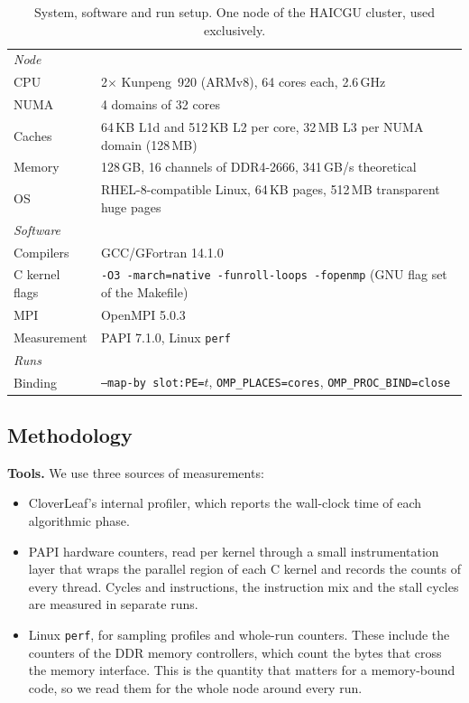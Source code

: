 \documentclass[a4paper,11pt]{article}
\newcommand{\GBs}{\,GB/s}
\begin{document}
\begin{table}[htbp]
  \centering\small
  \begin{tabular}{ll}
    \toprule
    \multicolumn{2}{l}{\textit{Node}} \\
    CPU            & 2$\times$ Kunpeng~920 (ARMv8), 64 cores each, 2.6\,GHz \\
    NUMA           & 4 domains of 32 cores \\
    Caches         & 64\,KB L1d and 512\,KB L2 per core, 32\,MB L3 per NUMA domain (128\,MB) \\
    Memory         & 128\,GB, 16 channels of DDR4-2666, 341\GBs{} theoretical \\
    OS             & RHEL-8-compatible Linux, 64\,KB pages, 512\,MB transparent huge pages \\
    \midrule
    \multicolumn{2}{l}{\textit{Software}} \\
    Compilers      & GCC/GFortran 14.1.0 \\
    C kernel flags & \texttt{-O3 -march=native -funroll-loops -fopenmp} (GNU flag set of the Makefile) \\
    MPI            & OpenMPI 5.0.3 \\
    Measurement    & PAPI 7.1.0, Linux \texttt{perf} \\
    \midrule
    \multicolumn{2}{l}{\textit{Runs}} \\
    Binding        & \texttt{--map-by slot:PE=}$t$, \texttt{OMP\_PLACES=cores}, \texttt{OMP\_PROC\_BIND=close} \\
    \bottomrule
  \end{tabular}
  \caption{System, software and run setup. One node of the HAICGU cluster, used exclusively.}
  \label{tab:system}
\end{table}

\subsection{Methodology}
\label{sec:method}
\textbf{Tools.} We use three sources of measurements:
\begin{itemize}
  \item CloverLeaf's internal profiler, which reports the wall-clock time of each algorithmic phase.
  \item PAPI hardware counters, read per kernel through a small instrumentation layer that wraps the parallel
        region of each C kernel and records the counts of every thread. Cycles and instructions, the
        instruction mix and the stall cycles are measured in separate runs.
  \item Linux \texttt{perf}, for sampling profiles and whole-run counters. These include the counters of the
        DDR memory controllers, which count the bytes that cross the memory interface. This is the quantity
        that matters for a memory-bound code, so we read them for the whole node around every run.
\end{itemize}
\end{document}
